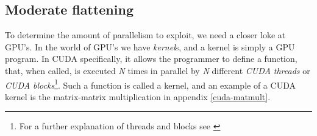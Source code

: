 \begin{comment}
	In the following sections we will look at how Futhark solves the problem of
	GPU's requiring flat parallelism, and the solution even being independent from
	this limitation. An example of a simple problem, that is not flat, is the
	\texttt{dotprod} function from listing \ref{matmultFuthark}. Here there is a \texttt{map2}\footnote{\texttt{map2} is a variant of \texttt{map} taking two arrays instead of a single element and an array. For example \texttt{map2 (+) [1,2,3] [4,5,6] $\to$ [5,7,9]}} which is nested inside of a \texttt{reduce}\footnote{Reduce does not obviously appear to be a parallel construct, due to the elements being dependent on each other, however this is done by a \textit{segmented reduce} \cite{segred}, making it effectively so.}, both operations are parallel, thereby giving \textit{nested parallelism}. In more general terms, nested parallelism is when there are parallel constructs nested within each other. Futhark supports such nested parallelism. More specifically, Futhark supports nested \textit{data}-parallelism. Data-parallelism is when some function/operation, is applied to a dataset in parallel, such that one thread uses function \texttt{x} on a subset of data \texttt{y}, and another thread also uses function \texttt{x}, but on a different subset of \texttt{y}. Other languages/environments that support nested data-parallelism are the likes of; CUDA, Open MP, OpenCL, NESL etc. With NESL being the conceptual precursor to the other languages. As mentoned earlier, NESL solved the issue of nested data-parallelism by flattening data structures (both regular and irregular), resulting in maximum parallelism, which can be inefficient. Therefore we need to determine when it is useful to exploit more parallelism. 
\end{comment}

\subsection{Moderate flattening}
To determine the amount of parallelism to exploit, we need a closer loke at GPU's. In the world of GPU's we have \textit{kernel}s, and a kernel is simply a GPU program. In CUDA specifically, it allows the programmer to define a function, that, when called, is executed \textit{N} times in parallel by \textit{N} different \textit{CUDA threads} or \textit{CUDA blocks}\footnote{For a further explanation of threads and blocks see \cite[p. 5-9]{prog-guide-cuda}}. Such a function is called a kernel, and an example of a CUDA kernel is the matrix-matrix multiplication in appendix \ref{cuda-matmult}. 

